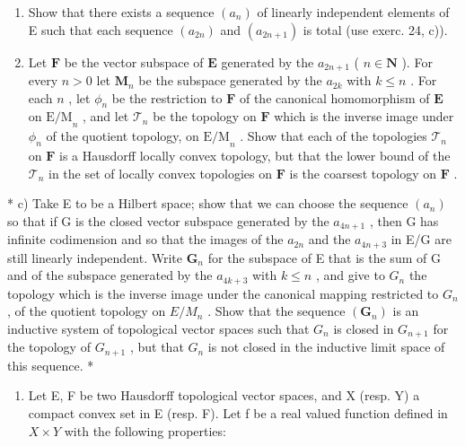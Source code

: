 \begin{enumerate}
\def\labelenumi{\alph{enumi})}
\item
  Show that there exists a sequence \((a_{n})\) of linearly independent elements of E such that each sequence \((a_{2n})\) and \((a_{2n + 1})\) is total (use exerc. 24, c)).
\item
  Let \(\mathbf{F}\) be the vector subspace of \(\mathbf{E}\) generated by the \(a_{2n + 1}\) ( \(n \in \mathbf{N}\) ). For every \(n > 0\) let \(\mathbf{M}_n\) be the subspace generated by the \(a_{2k}\) with \(k \leqslant n\) . For each \(n\) , let \(\phi_n\) be the restriction to \(\mathbf{F}\) of the canonical homomorphism of \(\mathbf{E}\) on \(\mathrm{E / M}_n\) , and let \(\mathcal{T}_n\) be the topology on \(\mathbf{F}\) which is the inverse image under \(\phi_n\) of the quotient topology, on \(\mathrm{E / M}_n\) . Show that each of the topologies \(\mathcal{T}_n\) on \(\mathbf{F}\) is a Hausdorff locally convex topology, but that the lower bound of the \(\mathcal{T}_n\) in the set of locally convex topologies on \(\mathbf{F}\) is the coarsest topology on \(\mathbf{F}\) .
\end{enumerate}

* c) Take E to be a Hilbert space; show that we can choose the sequence \((a_{n})\) so that if G is the closed vector subspace generated by the \(a_{4n + 1}\) , then G has infinite codimension and so that the images of the \(a_{2n}\) and the \(a_{4n + 3}\) in E/G are still linearly independent. Write \(\mathbf{G}_n\) for the subspace of E that is the sum of G and of the subspace generated by the \(a_{4k + 3}\) with \(k\leqslant n\) , and give to \(G_{n}\) the topology which is the inverse image under the canonical mapping restricted to \(G_{n}\) , of the quotient topology on \(E/M_{n}\) . Show that the sequence \((\mathbf{G}_{n})\) is an inductive system of topological vector spaces such that \(G_{n}\) is closed in \(G_{n+1}\) for the topology of \(G_{n+1}\) , but that \(G_{n}\) is not closed in the inductive limit space of this sequence. *

\begin{enumerate}
\def\labelenumi{\arabic{enumi})}
\setcounter{enumi}{26}
\tightlist
\item
  Let E, F be two Hausdorff topological vector spaces, and X (resp. Y) a compact convex set in E (resp. F). Let f be a real valued function defined in \(X \times Y\) with the following properties:
\end{enumerate}

